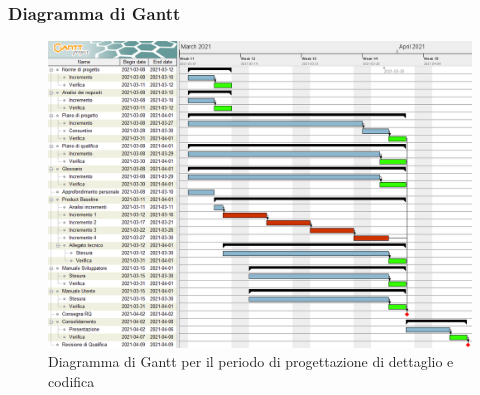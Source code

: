 \subsubsection{Diagramma di Gantt}

\begin{figure}[H]
\centering

\centerline{\includegraphics[scale=0.6]{res/Pianificazione/Gantt/codifica}}
\caption{Diagramma di Gantt per il periodo di progettazione di dettaglio e codifica}
\end{figure}
